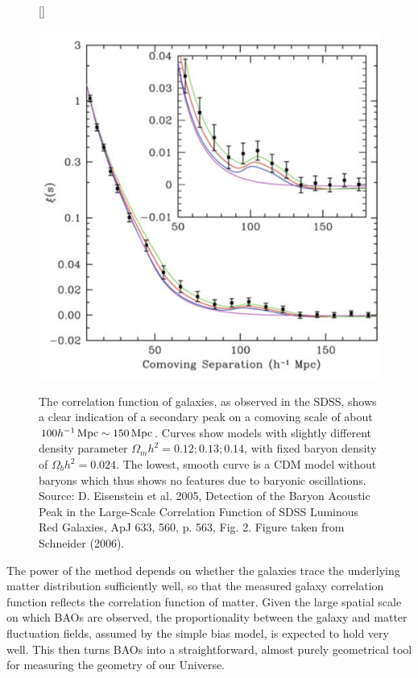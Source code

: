 \documentclass[a4paper,11pt]{article}
\begin{document}
\begin{figure}[h]
    [\FBwidth]
    {\caption{\footnotesize{The correlation function of galaxies, as observed in the SDSS, shows a clear indication of a secondary peak on a comoving scale of about $100h^{-1}\,{\rm Mpc}\sim150\,{\rm Mpc}$. Curves show models with slightly different density parameter $\Omega_mh^2 = 0.12; 0.13; 0.14$, with fixed baryon density of $\Omega_bh^2=0.024$. The lowest, smooth curve is a  CDM model without baryons which thus shows no features due to baryonic oscillations. Source: D. Eisenstein et al. 2005, Detection of the Baryon Acoustic Peak in the Large-Scale Correlation Function of SDSS Luminous Red Galaxies, ApJ 633, 560, p. 563, Fig. 2. Figure taken from Schneider (2006).}}
    \label{fig:correlationfunction}}
    {\includegraphics[width=12cm]{figures/CorrelationFunction.png}}
\end{figure}

{\noindent}The power of the method depends on whether the galaxies trace the underlying matter distribution sufficiently well, so that the measured galaxy correlation function reflects the correlation function of matter. Given the large spatial scale on which BAOs are observed, the proportionality between the galaxy and matter fluctuation fields, assumed by the simple bias model, is expected to hold very well. This then turns BAOs into a straightforward, almost purely geometrical tool for measuring the geometry of our Universe.
\end{document}
